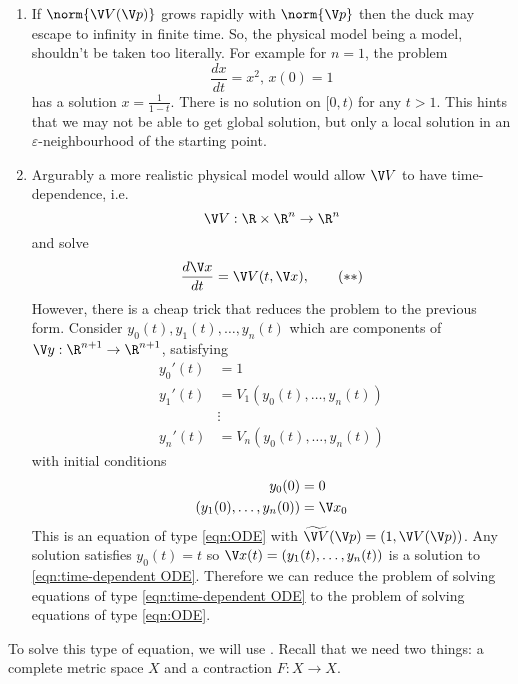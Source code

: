 \documentclass[a4paper]{article}
\theoremstyle{definition}
\begin{document}
\begin{remark}\leavevmode
  \begin{enumerate}
  \item If \(\norm{\V V(\V p)}\) grows rapidly with \(\norm{\V p}\) then the duck may escape to infinity in finite time. So, the physical model being a model, shouldn't be taken too literally. For example for \(n = 1\), the problem
    \[
      \frac{dx}{dt} = x^2, \, x(0) = 1
    \]
    has a solution \(x = \frac{1}{1 - t}\). There is no solution on \([0, t)\) for any \(t > 1\). This hints that we may not be able to get global solution, but only a local solution in an \(\varepsilon\)-neighbourhood of the starting point.
  \item Argurably a more realistic physical model would allow \(\V V\) to have time-dependence, i.e.
    \[
      \V V: \R \times \R^n \to \R^n
    \]
    and solve
    \begin{equation*}
      \label{eqn:time-dependent ODE}
      \frac{d \V x}{dt} = \V V(t, \V x),
      \tag{\(\ast\ast\)}
    \end{equation*}
    However, there is a cheap trick that reduces the problem to the previous form. Consider \(y_0(t), y_1(t), \dots, y_n(t)\) which are components of \(\V y: \R^{n + 1} \to \R^{n + 1}\), satisfying
    \begin{align*}
      y_0'(t) &= 1 \\
      y_1'(t) &= V_1(y_0(t), \dots, y_n(t)) \\
              & \vdots \\
      y_n'(t) &= V_n(y_0(t), \dots, y_n(t))
    \end{align*}
    with initial conditions
    \begin{align*}
      y_0(0) &= 0 \\
      (y_1(0), \dots, y_n(0)) &= \V x_0
    \end{align*}
    This is an equation of type \eqref{eqn:ODE} with \(\widetilde{\V V}(\V p) = (1, \V V(\V p))\). Any solution satisfies \(y_0(t) = t\) so \(\V x(t) = (y_1(t), \dots, y_n(t))\) is a solution to \eqref{eqn:time-dependent ODE}.
    Therefore we can reduce the problem of solving equations of type \eqref{eqn:time-dependent ODE} to the problem of solving equations of type \eqref{eqn:ODE}.
  \end{enumerate}
\end{remark}

To solve this type of equation, we will use . Recall that we need two things: a complete metric space \(X\) and a contraction \(F: X \to X\).
\end{document}
